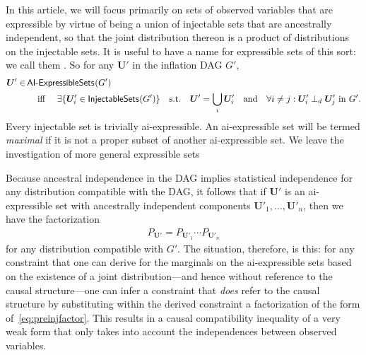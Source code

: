 \documentclass[aps,english,10pt,superscriptaddress,onecolumn,twoside,longbibliography,pra,floatfix,fleqn,nofootinbib]{revtex4-1}%
\newcommand*{\tblue}[1]{{\color{MidnightBlue}{\textbf{#1}}}}
\theoremstyle{definition}
\newcommand{\SmallNamedFunction}[3][]{\operatorname{\mathsf{#2}}_{#1}\parenths{#3}}
\newcommand{\aindep}{\ensuremath{\perp_d}} %
\DeclarePairedDelimiter{\parenths}{\lparen}{\rparen}
\begin{document}
In this article, we will focus primarily on sets of observed variables that are expressible by virtue of being a union of injectable sets that are ancestrally independent, so that the joint distribution thereon is a product of distributions on the injectable sets. It is useful to have a name for expressible sets of this sort: we call them \tblue{ai-expressible}.
   So for any $\bm{U}'$ in the inflation DAG $G'$,
\begin{align}\label{eq:defpreinj}
\begin{split}
\bm{U}'\in & \SmallNamedFunction{AI-ExpressibleSets}{G'} \\
	& \quad\text{ iff }\quad  \exists \{ \bm{U}'_i \in \SmallNamedFunction{InjectableSets}{G'} \} \quad \text{s.t.}\quad \bm{U}'=\bigcup_i \bm{U}'_i  \quad\text{and} \quad  \forall i\ne j: \bm{U}'_i \aindep \bm{U}'_j \text{ in }G'.
\end{split}
\end{align}
Every injectable set is trivially ai-expressible.  An ai-expressible set will be termed \emph{maximal} if it is not a proper subset of another ai-expressible set. We leave the investigation of more general expressible sets 

Because ancestral independence in the DAG implies statistical independence for any distribution compatible with the DAG, it follows that  if 
$\bm{U}'$ is an ai-expressible set with ancestrally independent components $\bm{U}'_1,\ldots,\bm{U}'_n$, then we have the factorization
\begin{align}\label{eq:preinjfactor}
P_{\bm{U}'} = P_{\bm{U}'_1} \cdots P_{\bm{U}'_n}
\end{align}
for any distribution compatible with $G'$. The situation, therefore, is this: for any constraint that one can derive for the marginals on the ai-expressible sets based on the existence of a joint distribution---and hence without reference to the causal structure---one can infer a constraint that {\em does} refer to the causal structure by substituting within the derived constraint a factorization of the form of~\cref{eq:preinjfactor}. This results in a causal compatibility inequality of a very weak form that only takes into account the independences between observed variables.
\end{document}
